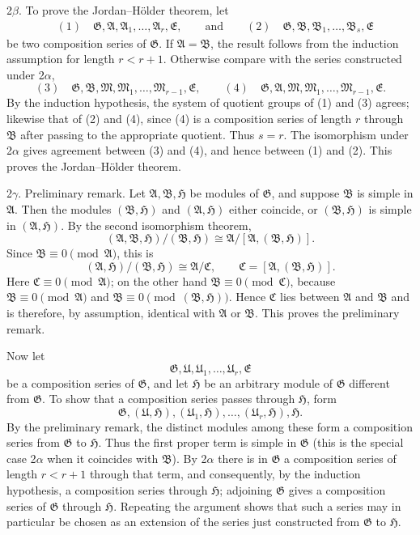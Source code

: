 \documentclass[11pt]{article}
\providecommand{\mM}{\mathfrak{M}}
\providecommand{\mA}{\mathfrak{A}}
\providecommand{\mB}{\mathfrak{B}}
\providecommand{\mC}{\mathfrak{C}}
\providecommand{\mE}{\mathfrak{E}}
\providecommand{\mG}{\mathfrak{G}}
\providecommand{\mH}{\mathfrak{H}}
\providecommand{\mU}{\mathfrak{U}}
\begin{document}
2$\beta$. To prove the Jordan--Hölder theorem, let
\[
\begin{aligned}
&(1)\quad \mG,\mA,\mA_1,\ldots,\mA_r,\mE,\qquad\text{and}\qquad
(2)\quad \mG,\mB,\mB_1,\ldots,\mB_s,\mE
\end{aligned}
\]
be two composition series of $\mG$. If $\mA=\mB$, the result follows from the induction assumption for length $r<r+1$. Otherwise compare with the series constructed under 2$\alpha$,
\[
        (3)\quad \mG,\mB,\mM,\mM_1,\ldots,\mM_{r-1},\mE,
        \qquad
        (4)\quad \mG,\mA,\mM,\mM_1,\ldots,\mM_{r-1},\mE.
\]
By the induction hypothesis, the system of quotient groups of (1) and (3) agrees; likewise that of (2) and (4), since (4) is a composition series of length $r$ through $\mB$ after passing to the appropriate quotient. Thus $s=r$. The isomorphism under 2$\alpha$ gives agreement between (3) and (4), and hence between (1) and (2). This proves the Jordan--Hölder theorem.

2$\gamma$. Preliminary remark. Let $\mA,\mB,\mH$ be modules of $\mG$, and suppose $\mB$ is simple in $\mA$. Then the modules $(\mB,\mH)$ and $(\mA,\mH)$ either coincide, or $(\mB,\mH)$ is simple in $(\mA,\mH)$. By the second isomorphism theorem,
\[
        (\mA,\mB,\mH)/(\mB,\mH)
        \cong
        \mA/[\mA,(\mB,\mH)].
\]
Since $\mB\equiv0\pmod{\mA}$, this is
\[
        (\mA,\mH)/(\mB,\mH)\cong \mA/\mC,
        \qquad \mC=[\mA,(\mB,\mH)].
\]
Here $\mC\equiv0\pmod{\mA}$; on the other hand $\mB\equiv0\pmod{\mC}$, because $\mB\equiv0\pmod{\mA}$ and $\mB\equiv0\pmod{(\mB,\mH)}$. Hence $\mC$ lies between $\mA$ and $\mB$ and is therefore, by assumption, identical with $\mA$ or $\mB$. This proves the preliminary remark.

Now let
\[
        \mG,\mU,\mU_1,\ldots,\mU_r,\mE
\]
be a composition series of $\mG$, and let $\mH$ be an arbitrary module of $\mG$ different from $\mG$. To show that a composition series passes through $\mH$, form
\[
        \mG,(\mU,\mH),(\mU_1,\mH),\ldots,(\mU_r,\mH),\mH.
\]
By the preliminary remark, the distinct modules among these form a composition series from $\mG$ to $\mH$. Thus the first proper term is simple in $\mG$ (this is the special case 2$\alpha$ when it coincides with $\mB$). By 2$\alpha$ there is in $\mG$ a composition series of length $r<r+1$ through that term, and consequently, by the induction hypothesis, a composition series through $\mH$; adjoining $\mG$ gives a composition series of $\mG$ through $\mH$. Repeating the argument shows that such a series may in particular be chosen as an extension of the series just constructed from $\mG$ to $\mH$.
\end{document}
